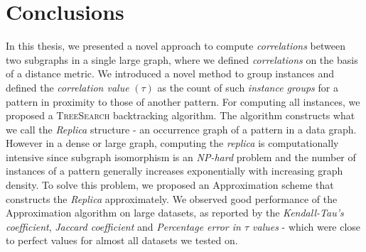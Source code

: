 \chapter{Conclusions}
\label{sec:conclusions}
In this thesis, we presented a novel approach to compute \textit{correlations}
between two subgraphs in a single large graph, where we defined
\textit{correlations} on the basis of a distance metric. We introduced a novel
method to group instances and defined the \textit{correlation value} $(\tau)$ as
the count of such \textit{instance groups} for a pattern in proximity to those
of another pattern. For computing all instances, we proposed a
\textsc{TreeSearch} backtracking algorithm. The algorithm constructs what we
call the \textit{Replica} structure - an occurrence graph of a pattern in a data
graph. However in a dense or large graph, computing the \textit{replica} is
computationally intensive since subgraph isomorphism is an \textit{NP-hard}
problem and the number of instances of a pattern generally increases
exponentially with increasing graph density. To solve this problem, we proposed
an Approximation scheme that constructs the \textit{Replica} approximately. We
observed good performance of the Approximation algorithm on large datasets, as
reported by the \textit{Kendall-Tau's coefficient}, \textit{Jaccard coefficient}
and \textit{Percentage error in $\tau$ values} - which were close to perfect
values for almost all datasets we tested on. 